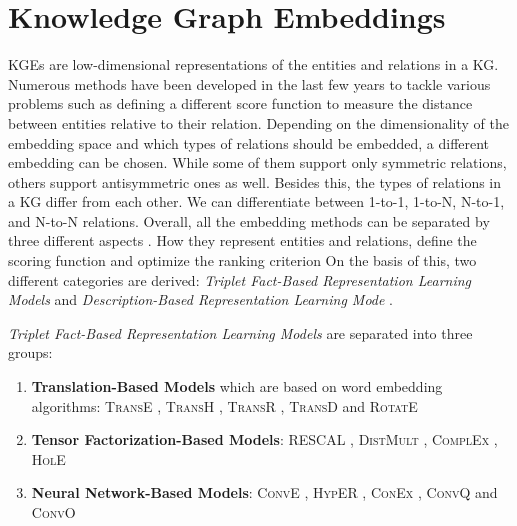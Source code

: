 \section{Knowledge Graph Embeddings} 
\acp{KGE} are low-dimensional representations of the entities and relations in a \ac{KG}. 
Numerous methods have been developed in the last few years to tackle various problems such as defining a different score function to measure the distance between entities relative to their relation.
Depending on the dimensionality of the embedding space and which types of relations should be embedded, a different embedding can be chosen.
While some of them support only symmetric relations, others support antisymmetric ones as well. 
Besides this, the types of relations in a \ac{KG} differ from each other.
We can differentiate between 1-to-1, 1-to-N, N-to-1, and N-to-N relations.
Overall, all the embedding methods can be separated by three different aspects \cite{electronics9050750}.
How they represent entities and relations, define the scoring function and optimize the ranking criterion
On the basis of this, two different categories are derived:
\textit{Triplet Fact-Based Representation Learning Models} and \textit{Description-Based Representation Learning Mode} \cite{electronics9050750}.

\textit{Triplet Fact-Based Representation Learning Models} are separated into three groups:
\begin{enumerate}
    \item 
    \textbf{Translation-Based Models}  which are based on word embedding algorithms: 
    \textsc{TransE} \cite{TransE}, \textsc{TransH} \cite{TransH}, \textsc{TransR} \cite{TransR}, \textsc{TransD} \cite{TransD}
    and 
    \textsc{RotatE} \cite{RotatE}
    
    \item 
    \textbf{Tensor Factorization-Based Models}:
    \textsc{RESCAL} \cite{RESCAL}, \textsc{DistMult} \cite{DistMult}, \textsc{ComplEx} \cite{ComplEx}, \textsc{HolE} \cite{HolE}
    
    \item 
    \textbf{Neural Network-Based Models}:
    \textsc{ConvE} \cite{ConvE}, \textsc{HypER} \cite{HypER}, \textsc{ConEx} \cite{ConEx}, \textsc{ConvQ} and  \textsc{ConvO} \cite{demir2021convolutional}
\end{enumerate}


